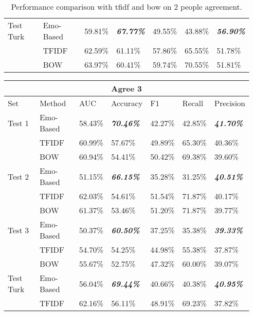 \documentclass[12pt,a4paper]{report}
\theoremstyle{definition}
\begin{document}
\begin{CJK}{UTF8}{bsmi}
\begin{table}[H]
\begin{tabular}{l | l | l | l | l | l | l}
                \hline
                Test Turk & Emo-Based & 59.81\% & \textit{\textbf{67.77\%}} & 49.55\% & 43.88\% & \textit{\textbf{56.90\%}}\\
                 & TFIDF & 62.59\% & 61.11\% & 57.86\% & 65.55\% & 51.78\%\\
                 & BOW & 63.97\% & 60.41\% & 59.74\% & 70.55\% & 51.81\%\\
                \hline
            \end{tabular}
            \caption{Performance comparison with tfidf and bow on 2 people agreement.}
            \label{tab:tfidf_bow_agree2}
        \end{table}
        \begin{table}[H]
            \centering
            \begin{tabular}{l | l | l | l | l | l | l}
                \hline
                \multicolumn{7}{c}{\textbf{Agree 3}} \\
                \hline
                Set & Method & AUC & Accuracy & F1 & Recall & Precision \\
                \hline \hline
                Test 1 & Emo-Based & 58.43\% & \textit{\textbf{70.46\%}} & 42.27\% & 42.85\% & \textit{\textbf{41.70\%}}\\
                 & TFIDF & 60.99\% & 57.67\% & 49.89\% & 65.30\% & 40.36\%\\
                 & BOW & 60.94\% & 54.41\% & 50.42\% & 69.38\% & 39.60\%\\
                \hline
                Test 2 & Emo-Based & 51.15\% & \textit{\textbf{66.15\%}} & 35.28\% & 31.25\% &\textit{\textbf{40.51\%}}\\
                 & TFIDF & 62.03\% & 54.61\% & 51.54\% & 71.87\% & 40.17\%\\
                 & BOW & 61.37\% & 53.46\% & 51.20\% & 71.87\% & 39.77\%\\
                \hline
                Test 3 & Emo-Based & 50.37\% & \textit{\textbf{60.50\%}} & 37.25\% & 35.38\% & \textit{\textbf{39.33\%}}\\
                 & TFIDF & 54.70\% & 54.25\% & 44.98\% & 55.38\% & 37.87\%\\
                 & BOW & 55.67\% & 52.75\% & 47.32\% & 60.00\% & 39.07\%\\
                \hline
                Test Turk & Emo-Based & 56.04\% & \textit{\textbf{69.44\%}} & 40.66\% & 40.38\% & \textit{\textbf{40.95\%}}\\
                 & TFIDF & 62.16\% & 56.11\% & 48.91\% & 69.23\% & 37.82\%\\

\end{tabular}
\end{table}
\end{CJK}
\end{document}
